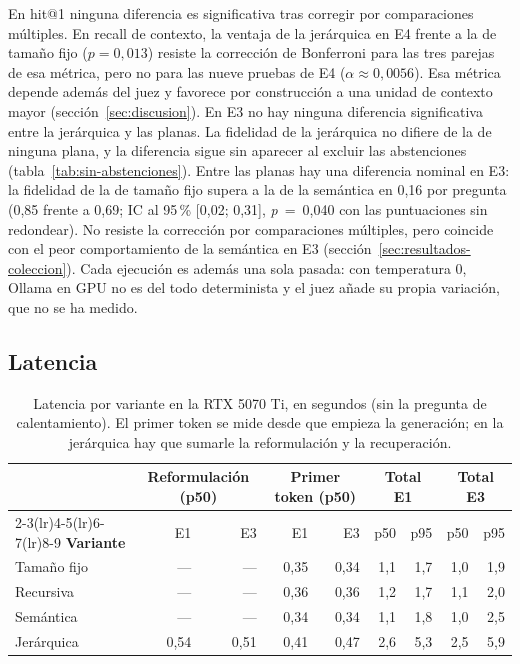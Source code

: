 En hit@1 ninguna diferencia es significativa tras corregir por comparaciones múltiples. En recall de contexto, la ventaja de la jerárquica en E4 frente a la de tamaño fijo ($p = 0{,}013$) resiste la corrección de Bonferroni para las tres parejas de esa métrica, pero no para las nueve pruebas de E4 ($\alpha \approx 0{,}0056$). Esa métrica depende además del juez y favorece por construcción a una unidad de contexto mayor (sección~\ref{sec:discusion}). En E3 no hay ninguna diferencia significativa entre la jerárquica y las planas. La fidelidad de la jerárquica no difiere de la de ninguna plana, y la diferencia sigue sin aparecer al excluir las abstenciones (tabla~\ref{tab:sin-abstenciones}). Entre las planas hay una diferencia nominal en E3: la fidelidad de la de tamaño fijo supera a la de la semántica en 0,16 por pregunta (0,85 frente a 0,69; IC al 95\,\% [0,02; 0,31], \textit{p}~=~0,040 con las puntuaciones sin redondear). No resiste la corrección por comparaciones múltiples, pero coincide con el peor comportamiento de la semántica en E3 (sección~\ref{sec:resultados-coleccion}). Cada ejecución es además una sola pasada: con temperatura 0, Ollama en GPU no es del todo determinista y el juez añade su propia variación, que no se ha medido.

\subsection{Latencia}

\begin{table}[htbp]
\centering\small
\caption[Latencia por variante en la RTX 5070 Ti]{Latencia por variante en la RTX 5070 Ti, en segundos (sin la pregunta de calentamiento). El primer token se mide desde que empieza la generación; en la jerárquica hay que sumarle la reformulación y la recuperación.}
\label{tab:resultados-latencia}
\begin{tabular}{@{}l rr rr rr rr@{}}
\toprule
& \multicolumn{2}{c}{\textbf{Reformulación (p50)}} & \multicolumn{2}{c}{\textbf{Primer token (p50)}} & \multicolumn{2}{c}{\textbf{Total E1}} & \multicolumn{2}{c}{\textbf{Total E3}} \\
\cmidrule(lr){2-3}\cmidrule(lr){4-5}\cmidrule(lr){6-7}\cmidrule(lr){8-9}
\textbf{Variante} & E1 & E3 & E1 & E3 & p50 & p95 & p50 & p95 \\
\midrule
Tamaño fijo & --- & --- & 0,35 & 0,34 & 1,1 & 1,7 & 1,0 & 1,9 \\
Recursiva   & --- & --- & 0,36 & 0,36 & 1,2 & 1,7 & 1,1 & 2,0 \\
Semántica   & --- & --- & 0,34 & 0,34 & 1,1 & 1,8 & 1,0 & 2,5 \\
Jerárquica  & 0,54 & 0,51 & 0,41 & 0,47 & 2,6 & 5,3 & 2,5 & 5,9 \\
\bottomrule
\end{tabular}
\end{table}

